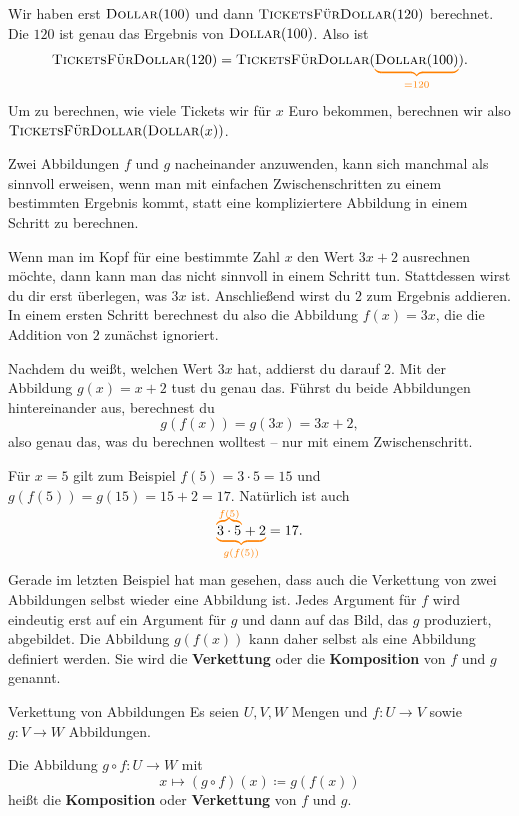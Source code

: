 \documentclass[../../main.tex]{subfiles}
\begin{document}
\begin{example}{}
    Wir haben erst $\textsc{Dollar}(100)$ und dann $\textsc{TicketsFürDollar}(120)$ berechnet. Die $120$ ist genau das Ergebnis von $\textsc{Dollar}(100)$. Also ist \[\textsc{TicketsFürDollar}(120)=\textsc{TicketsFürDollar}(\colorbrace{\textsc{Dollar}(100)}{=120}).\]
    
    Um zu berechnen, wie viele Tickets wir für $x$ Euro bekommen, berechnen wir also $\textsc{TicketsFürDollar}(\textsc{Dollar}(x))$.
\end{example}

Zwei Abbildungen $f$ und $g$ nacheinander anzuwenden, kann sich manchmal als sinnvoll erweisen, wenn man mit einfachen Zwischenschritten zu einem bestimmten Ergebnis kommt, statt eine kompliziertere Abbildung in einem Schritt zu berechnen.

\begin{example}{}
    Wenn man im Kopf für eine bestimmte Zahl $x$ den Wert $3x+2$ ausrechnen möchte, dann kann man das nicht sinnvoll in einem Schritt tun. Stattdessen wirst du dir erst überlegen, was $3x$ ist. Anschließend wirst du $2$ zum Ergebnis addieren. In einem ersten Schritt berechnest du also die Abbildung $f(x)=3x$, die die Addition von $2$ zunächst ignoriert.
    
    Nachdem du weißt, welchen Wert $3x$ hat, addierst du darauf $2$. Mit der Abbildung $g(x)=x+2$ tust du genau das. Führst du beide Abbildungen hintereinander aus, berechnest du \[g(f(x))=g(3x)=3x+2,\] also genau das, was du berechnen wolltest -- nur mit einem Zwischenschritt.
    
    Für $x=5$ gilt zum Beispiel $f(5)=3\cdot 5=15$ und $g(f(5))=g(15)=15+2=17$. Natürlich ist auch \[\colorbrace{\colorobrace{3\cdot 5}{f(5)}+2}{g(f(5))}=17.\]
\end{example}

Gerade im letzten Beispiel hat man gesehen, dass auch die Verkettung von zwei Abbildungen selbst wieder eine Abbildung ist. Jedes Argument für $f$ wird eindeutig erst auf ein Argument für $g$ und dann auf das Bild, das $g$ produziert, abgebildet. Die Abbildung $g(f(x))$ kann daher selbst als eine Abbildung definiert werden. Sie wird die \textbf{Verkettung} oder die \textbf{Komposition} von $f$ und $g$ genannt.

\begin{definition}{Verkettung von Abbildungen}
    Es seien $U,V,W$ Mengen und $f\colon U\rightarrow V$ sowie $g\colon V\rightarrow W$ Abbildungen.
    
    Die Abbildung $g\circ f\colon U\rightarrow W$ mit \[x\mapsto (g\circ f)(x)\coloneqq g(f(x))\] heißt die \textbf{Komposition} oder \textbf{Verkettung} von $f$ und $g$.
\end{definition}
\end{document}
